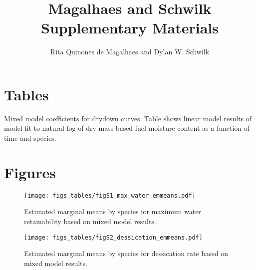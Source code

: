 \documentclass[letterpaper]{article}
\title{Magalhaes and Schwilk Supplementary Materials}
\author{Rita Quinones de Magalhaes and Dylan W. Schwilk}
\begin{document}
\maketitle

\section{Tables}

\begin{table}[h]
  \caption{Mixed model coefficients for drydown curves. Table shows linear model results of model fit to  natural log of dry-mass based fuel moisture content as a function of time and species.} 
  \label{tabS1}
\centering

\end{table}

\section{Figures}

\begin{figure}[h]
  \centering
  \label{fig-S1}

  \texttt{[image: figs\_tables/figS1\_max\_water\_emmeans.pdf]}
\caption{Estimated marginal means by species for maximum water retainability based on mixed model results.}

\end{figure}


\begin{figure}[h]
  \centering
  \label{fig-S2}
\texttt{[image: figs\_tables/figS2\_dessication\_emmeans.pdf]}
\caption{Estimated marginal means by species for dessication rate based on mixed model results.}
\end{figure}
\end{document}
